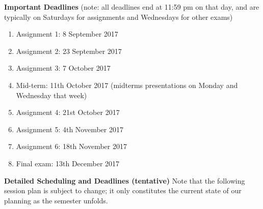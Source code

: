 \documentclass[11pt,a4paper]{article}
\begin{document}
\bigskip\textbf{\large Important Deadlines}
(note: all deadlines end at 11:59 pm on that day, and are typically on Saturdays for assignments and Wednesdays for other exams)
\begin{enumerate}
\item Assignment 1: 8 September 2017
\item Assignment 2: 23 September 2017
\item Assignment 3: 7 October 2017
\item Mid-term: 11th October 2017 (midterms presentations on Monday and Wednesday that week)
\item Assignment 4: 21st October 2017
\item Assignment 5: 4th November 2017
\item Assignment 6: 18th November 2017
\item Final exam: 13th December 2017
\end{enumerate}

\bigskip\textbf{\large Detailed Scheduling and Deadlines (tentative)}
Note that the following session plan is subject to change; it only
constitutes the current state of our planning as the semester unfolds.
\end{document}
